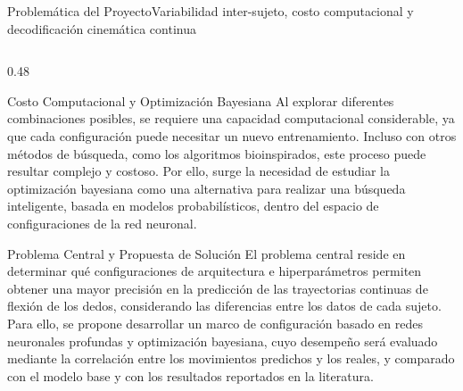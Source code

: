 \begin{frame}{Problem\'atica del Proyecto}{Variabilidad inter-sujeto, costo computacional y decodificaci\'on cinem\'atica continua \cite{miller2008prediction}}
\begin{columns}[T,onlytextwidth]
    \begin{column}{0.48\textwidth}
      \begin{block}{Costo Computacional y Optimizaci\'on Bayesiana}
        \scriptsize
        Al explorar diferentes combinaciones posibles, se requiere una capacidad computacional considerable, ya que cada configuraci\'on puede necesitar un nuevo entrenamiento. Incluso con otros m\'etodos de b\'usqueda, como los algoritmos bioinspirados, este proceso puede resultar complejo y costoso. Por ello, surge la necesidad de estudiar la optimizaci\'on bayesiana como una alternativa para realizar una b\'usqueda inteligente, basada en modelos probabil\'isticos, dentro del espacio de configuraciones de la red neuronal.
      \end{block}
      \vspace{1.5mm}
      \begin{alertblock}{Problema Central y Propuesta de Soluci\'on}
        \scriptsize
        El problema central reside en determinar qu\'e configuraciones de arquitectura e hiperpar\'ametros permiten obtener una mayor precisi\'on en la predicci\'on de las trayectorias continuas de flexi\'on de los dedos, considerando las diferencias entre los datos de cada sujeto. Para ello, se propone desarrollar un marco de configuraci\'on basado en redes neuronales profundas y optimizaci\'on bayesiana, cuyo desempe\~no ser\'a evaluado mediante la correlaci\'on entre los movimientos predichos y los reales, y comparado con el modelo base y con los resultados reportados en la literatura.
      \end{alertblock}
    \end{column}
  \end{columns}
\end{frame}

